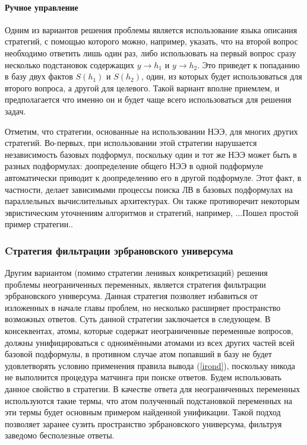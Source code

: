 \paragraph{Ручное управление}
Одним из вариантов решения проблемы является использование языка описания стратегий, с помощью которого можно, например, указать, что на второй вопрос необходимо ответить лишь один раз, либо использовать на первый вопрос сразу несколько подстановок содержащих $y\rightarrow h_1$ и $y\rightarrow h_2$. Это приведет к попаданию в базу двух фактов $S(h_1)$ и $S(h_2)$, один, из которых будет использоваться для второго вопроса, а другой для целевого. Такой вариант вполне приемлем, и предполагается что именно он и будет чаще всего использоваться для решения задач.  

Отметим, что стратегии, основанные на использовании НЭЭ,  для многих других стратегий. Во-первых, при использовании этой стратегии нарушается независимость базовых подформул, поскольку один и тот же НЭЭ может быть в разных подформулах: доопределение общего НЭЭ в одной подформуле автоматически приводит к доопределению его в другой подформуле. Этот факт, в частности, делает зависимыми процессы поиска ЛВ в базовых подформулах на параллельных вычислительных архитектурах. Он также противоречит некоторым эвристическим уточнениям алгоритмов и стратегий, например, {...}{Пошел простой пример стратегии.}.

\subsubsection{Cтратегия фильтрации эрбрановского универсума}
Другим вариантом (помимо стратегии ленивых конкретизаций) решения проблемы неограниченных переменных, является стратегия фильтрации эрбрановского универсума. Данная стратегия позволяет избавиться от изложенных в начале главы проблем, но несколько расширяет пространство возможных ответов. Суть данной стратегии заключается в следующем. В консеквентах, атомы, которые содержат неограниченные переменные вопросов, должны унифицироваться с одноимёнными атомами из всех других частей всей базовой подформулы, в противном случае атом попавший в базу не будет удовлетворять условию применения правила вывода (\ref{irond}), поскольку никода не выполнится процедура матчинга при поиске ответов. Будем использовать данное свойство в стратегии. В качестве ответа для неограниченных переменных используются такие термы, что атом полученный подстановкой переменных на эти термы будет основным примером найденной унификации. Такой подход позволяет заранее сузить пространство эрбрановского универсума, фильтруя заведомо бесполезные ответы.

